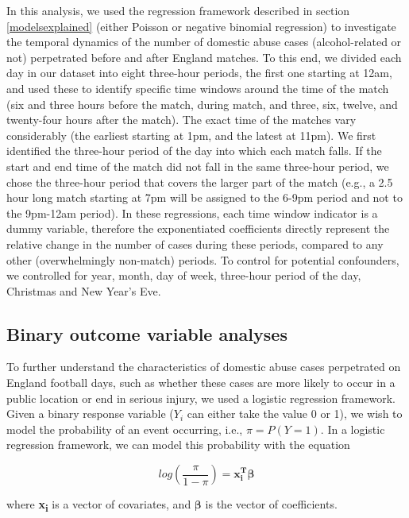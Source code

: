 \documentclass[12pt, a4paper]{article}
\newcommand{\vect}[1]{\boldsymbol{#1}}
\begin{document}
In this analysis, we used the regression framework described in section \ref{modelsexplained} (either Poisson or negative binomial regression) to investigate the temporal dynamics of the number of domestic abuse cases (alcohol-related or not) perpetrated before and after England matches. To this end, we divided each day in our dataset into eight three-hour periods, the first one starting at 12am, and used these to identify specific time windows around the time of the match (six and three hours before the match, during match, and three, six, twelve, and twenty-four hours after the match). The exact time of the matches vary considerably (the earliest starting at 1pm, and the latest at 11pm). We first identified the three-hour period of the day into which each match falls. If the start and end time of the match did not fall in the same three-hour period, we chose the three-hour period that covers the larger part of the match (e.g., a 2.5 hour long match starting at 7pm will be assigned to the 6-9pm period and not to the 9pm-12am period). In these regressions, each time window indicator is a dummy variable, therefore the exponentiated coefficients directly represent the relative change in the number of cases during these periods, compared to any other (overwhelmingly non-match) periods. To control for potential confounders, we controlled for year, month, day of week, three-hour period of the day, Christmas and New Year's Eve.


\subsection{Binary outcome variable analyses}

To further understand the characteristics of domestic abuse cases perpetrated on England football days, such as whether these cases are more likely to occur in a public location or end in serious injury, we used a logistic regression framework. 
Given a binary response variable ($Y_{i}$ can either take the value 0 or 1), we wish to model the probability of an event occurring, i.e., $\pi = P(Y = 1)$. 
In a logistic regression framework, we can model this probability with the equation

\begin{equation}
log(\frac{\pi}{1-\pi})= \vect{x_i^{T}}\vect{\beta}
\end{equation}

where \textbf{x\textsubscript{i}} is a vector of covariates, and $\boldsymbol{\beta}$ is the vector of coefficients.
\end{document}
